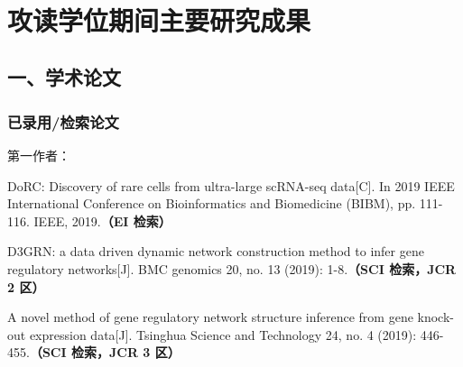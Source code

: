 {~}
\vspace{-9pt}
\section{攻读学位期间主要研究成果} %

\ifblindreview
\fi
\vspace{11pt}
\subsection*{一、学术论文}

\ifblindreview

\subsubsection*{已录用/检索论文}
第一作者：
\begin{enumerate}[label={[\arabic*]},itemindent=2em,wide]

\item DoRC: Discovery of rare cells from ultra-large scRNA-seq data[C]. In 2019 IEEE International Conference on Bioinformatics and Biomedicine (BIBM), pp. 111-116. IEEE, 2019.{\bfseries \heiti（EI 检索）}
\item D3GRN: a data driven dynamic network construction method to infer gene regulatory networks[J]. BMC genomics 20, no. 13 (2019): 1-8.{\bfseries \heiti（SCI 检索，JCR 2 区）} 
\item A novel method of gene regulatory network structure inference from gene knock-out expression data[J]. Tsinghua Science and Technology 24, no. 4 (2019): 446-455.{\bfseries \heiti（SCI 检索，JCR 3 区）} 

\end{enumerate}
